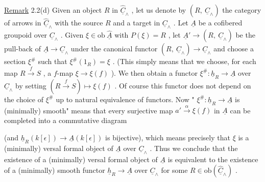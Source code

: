 \underline{Remark} 2.2(d)  Given an object  $R$  in  $\widehat{\underline{C}}_\wedge$ , let us denote by  $(R,\ \underline{C}_\wedge)$  the category of arrows in  $\widehat{\underline{C}}_\wedge$  with the source  $R$  and a target in  $\underline{C}_\wedge$ . Let  $\underline{A}$  be a cofibered groupoid over  $\underline{C}_\wedge$ . Given  $\xi \in \mathrm{ob}\ \widehat{\underline{A}}$  with  $P(\xi) = R$ , let  $\underline{A}' \longrightarrow (R,\ \underline{C}_\wedge)$  be the pull-back of  $\underline{A} \longrightarrow \underline{C}_\wedge$  under the canonical functor  $(R,\ \underline{C}_\wedge) \longrightarrow \underline{C}_\wedge$  and choose a section  $\xi^{\#}$  such that  $\xi^{\#}(1_R) = \xi$ . (This simply means that we choose, for each map  $R \xrightarrow{\ f\ } S$ , a $f$-map  $\xi \longrightarrow \xi(f)$ ). We then obtain a functor  $\xi^{\#} : \underline{h}_R \longrightarrow \underline{A}$  over  $\underline{C}_\wedge$  by setting  $(R \xrightarrow{\ f\ } S) \longmapsto \xi(f)$ . Of course this functor does not depend on the choice of  $\xi^{\#}$  up to natural equivalence of functors. Now  " $\xi^{\#} : \underline{h}_R \longrightarrow \underline{A}$  is (minimally) smooth"  means that every surjective map  $a' \xrightarrow{\ \alpha\ } \xi(f)$  in  $\underline{A}$  can be completed into a commutative diagram

\begin{center}
\end{center}
(and  $\underline{h}_R(k[\epsilon]) \longrightarrow \underline{A}(k[\epsilon])$   is bijective), which means precisely that  $\xi$  is a (minimally) versal formal object of  $\underline{A}$  over  $\underline{C}_\wedge$ . Thus we conclude that the existence of a (minimally) versal formal object of  $\underline{A}$  is equivalent to the existence of a (minimally) smooth functor  $\underline{h}_R \longrightarrow \underline{A}$  over  $\underline{C}_\wedge$  for some  $R \in \mathrm{ob}(\widehat{\underline{C}}_\wedge)$ .

